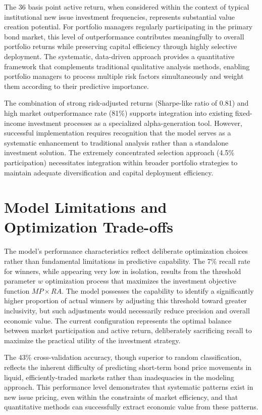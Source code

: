 The 36 basis point active return, when considered within the context of typical institutional new issue investment frequencies, represents substantial value creation potential. For portfolio managers regularly participating in the primary bond market, this level of outperformance contributes meaningfully to overall portfolio returns while preserving capital efficiency through highly selective deployment. The systematic, data-driven approach provides a quantitative framework that complements traditional qualitative analysis methods, enabling portfolio managers to process multiple risk factors simultaneously and weight them according to their predictive importance.

The combination of strong risk-adjusted returns (Sharpe-like ratio of 0.81) and high market outperformance rate (81\%) supports integration into existing fixed-income investment processes as a specialized alpha-generation tool. However, successful implementation requires recognition that the model serves as a systematic enhancement to traditional analysis rather than a standalone investment solution. The extremely concentrated selection approach (4.5\% participation) necessitates integration within broader portfolio strategies to maintain adequate diversification and capital deployment efficiency.

\section{Model Limitations and Optimization Trade-offs}

The model's performance characteristics reflect deliberate optimization choices rather than fundamental limitations in predictive capability. The 7\% recall rate for winners, while appearing very low in isolation, results from the threshold parameter $w$ optimization process that maximizes the investment objective function $MP \times RA$. The model possesses the capability to identify a significantly higher proportion of actual winners by adjusting this threshold toward greater inclusivity, but such adjustments would necessarily reduce precision and overall economic value. The current configuration represents the optimal balance between market participation and active return, deliberately sacrificing recall to maximize the practical utility of the investment strategy.

The 43\% cross-validation accuracy, though superior to random classification, reflects the inherent difficulty of predicting short-term bond price movements in liquid, efficiently-traded markets rather than inadequacies in the modeling approach. This performance level demonstrates that systematic patterns exist in new issue pricing, even within the constraints of market efficiency, and that quantitative methods can successfully extract economic value from these patterns.

